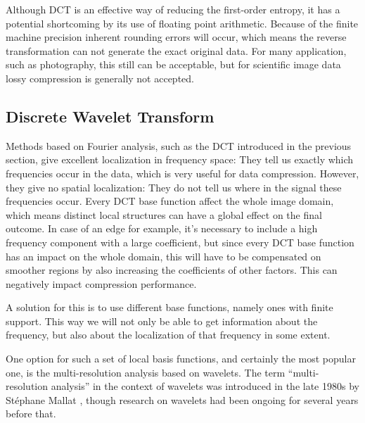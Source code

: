 \documentclass{diploma_style}
\begin{document}
Although DCT is an effective way of reducing the first-order entropy, it has a potential shortcoming by its use of floating point arithmetic. Because of the finite machine precision inherent rounding errors will occur, which means the reverse transformation can not generate the exact original data. For many application, such as photography, this still can be acceptable, but for scientific image data lossy compression is generally not accepted.


\subsection{Discrete Wavelet Transform}
Methods based on Fourier analysis, such as the DCT introduced in the previous section, give excellent localization in frequency space: They tell us exactly which frequencies occur in the data, which is very useful for data compression. However, they give no spatial localization: They do not tell us where in the signal these frequencies occur. Every DCT base function affect the whole image domain, which means distinct local structures can have a global effect on the final outcome. In case of an edge for example, it's necessary to include a high frequency component with a large coefficient, but since every DCT base function has an impact on the whole domain, this will have to be compensated on smoother regions by also increasing the coefficients of other factors. This can negatively impact compression performance.

A solution for this is to use different base functions, namely ones with finite support. This way we will not only be able to get information about the frequency, but also about the localization of that frequency in some extent.

One option for such a set of local basis functions, and certainly the most popular one, is the multi-resolution analysis based on wavelets. The term “multi-resolution analysis” in the context of wavelets was introduced in the late 1980s by Stéphane Mallat \cite{mallat_theory_1989}, though research on wavelets had been ongoing for several years before that.
\end{document}
